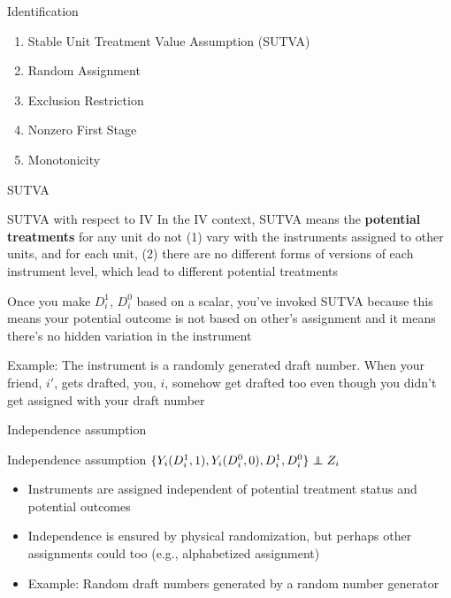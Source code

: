 \documentclass{beamer}
\newcommand\independent{\protect\mathpalette{\protect\independenT}{\perp}}
\def\independenT#1#2{\mathrel{\rlap{$#1#2$}\mkern2mu{#1#2}}}
\begin{document}
\begin{frame}{Identification}
		
	\begin{enumerate}
	\item Stable Unit Treatment Value Assumption (SUTVA)
	\item Random Assignment
	\item Exclusion Restriction
	\item Nonzero First Stage
	\item Monotonicity
	\end{enumerate}
\end{frame}


\begin{frame}{SUTVA}

\begin{block}{SUTVA with respect to IV}
In the IV context, SUTVA means the \textbf{potential treatments} for any unit do not (1) vary with the instruments assigned to other units, and for each unit, (2) there are no different forms of versions of each instrument level, which lead to different potential treatments
\end{block}

\bigskip

Once you make $D^1_i$, $D^0_i$ based on a scalar, you've invoked SUTVA because this means your potential outcome is not based on other's assignment and it means there's no hidden variation in the instrument

\bigskip

Example:   The instrument is a randomly generated draft number. When your friend, $i'$, gets drafted, you, $i$, somehow get drafted too even though you didn't get assigned with your draft number


\end{frame}

		


\begin{frame}{Independence assumption}
	
	\begin{block}{Independence assumption}
	$\{Y_i(D^1_i,1),Y_i(D^0_i,0),D^1_{i},D^{0}_i\} \independent{Z}_i$
	\end{block}

\begin{itemize}	
\item Instruments are assigned independent of potential treatment status and potential outcomes
\item Independence is ensured by physical randomization, but perhaps other assignments could too (e.g., alphabetized assignment)
\item Example: Random draft numbers generated by a random number generator
\end{itemize}

\end{frame}
\end{document}
